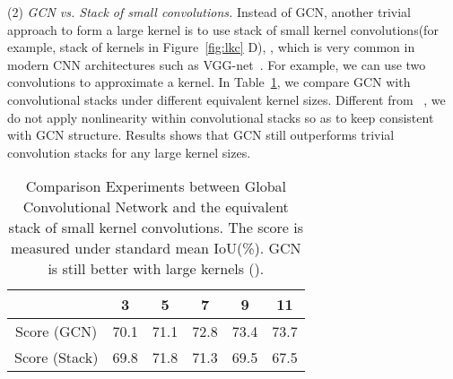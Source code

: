 \documentclass[10pt,twocolumn,letterpaper]{article}
\begin{document}
\par
	(2) \emph{GCN vs. Stack of small convolutions.} Instead of GCN, another trivial approach to form a large kernel is to use stack of small kernel convolutions(for example, stack of  kernels in Figure~\ref{fig:lkc} D), , which is very common in modern CNN architectures such as VGG-net~\cite{simonyan2014very}. For example, we can use two  convolutions to approximate a  kernel. In Table~\ref{table:exp-on-stack}, we compare GCN with convolutional stacks under different equivalent kernel sizes. Different from ~\cite{simonyan2014very}, we do not apply nonlinearity within convolutional stacks so as to keep consistent with GCN structure. Results shows that GCN still outperforms trivial convolution stacks for any large kernel sizes. 
   \begin{table}[h]
      \begin{center}
         \begin{tabular}{|c|c|c|c|c|c|}
         	\hline
         	 & 3 & 5 & 7 & 9 & 11\\
         	\hline
         	Score (GCN)  & 70.1 & 71.1 & 72.8 & 73.4 & 73.7\\
         	\hline
         	Score (Stack) & 69.8 & 71.8 & 71.3 & 69.5 & 67.5 \\
\hline
         \end{tabular}
      \end{center}
      \caption{Comparison Experiments between Global Convolutional Network and the equivalent stack of small kernel convolutions. The score is measured under standard mean IoU(\%). GCN is still better with large kernels (). }
      \label{table:exp-on-stack}
   \end{table}
   
\end{document}
